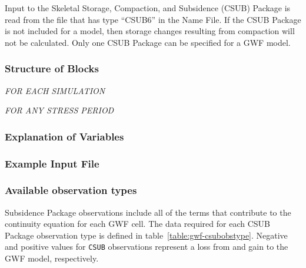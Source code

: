 Input to the Skeletal Storage, Compaction, and Subsidence (CSUB) Package is read from the file that has type ``CSUB6'' in the Name File.  If the CSUB Package is not included for a model, then storage changes resulting from compaction will not be calculated.  Only one CSUB Package can be specified for a GWF model.

\vspace{5mm}
\subsubsection{Structure of Blocks}

\vspace{5mm}
\noindent \textit{FOR EACH SIMULATION}




\vspace{5mm}
\noindent \textit{FOR ANY STRESS PERIOD}

\packageperioddescription

\vspace{5mm}
\subsubsection{Explanation of Variables}
\begin{description}

\end{description}

\vspace{5mm}
\subsubsection{Example Input File}



\vspace{5mm}
\subsubsection{Available observation types}
Subsidence Package observations include all of the terms that contribute to the continuity equation for each GWF cell. The data required for each CSUB Package observation type is defined in table~\ref{table:gwf-csubobstype}. Negative and positive values for \texttt{CSUB} observations represent a loss from and gain to the GWF model, respectively.


